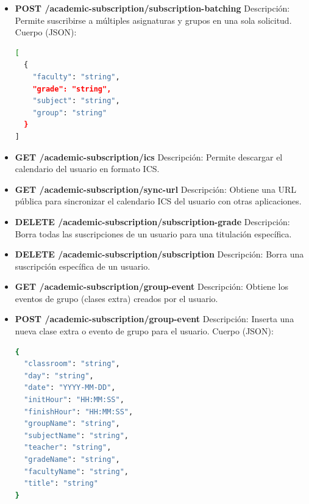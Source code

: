 \begin{itemize}
\begin{itemize}
        \item \textbf{POST /academic-subscription/subscription-batching}
        \newline Descripción: Permite suscribirse a múltiples asignaturas y grupos en una sola solicitud.
        \newline Cuerpo (JSON):
\begin{lstlisting}[language=bash]
[
  {
    "faculty": "string",
    "grade": "string",
    "subject": "string",
    "group": "string"
  }
]
\end{lstlisting}

        \item \textbf{GET /academic-subscription/ics}
        \newline Descripción: Permite descargar el calendario del usuario en formato ICS.

        \item \textbf{GET /academic-subscription/sync-url}
        \newline Descripción: Obtiene una URL pública para sincronizar el calendario ICS del usuario con otras aplicaciones.

        \item \textbf{DELETE /academic-subscription/subscription-grade}
        \newline Descripción: Borra todas las suscripciones de un usuario para una titulación específica.

        \item \textbf{DELETE /academic-subscription/subscription}
        \newline Descripción: Borra una suscripción específica de un usuario.

        \item \textbf{GET /academic-subscription/group-event}
        \newline Descripción: Obtiene los eventos de grupo (clases extra) creados por el usuario.

        \item \textbf{POST /academic-subscription/group-event}
        \newline Descripción: Inserta una nueva clase extra o evento de grupo para el usuario.
        \newline Cuerpo (JSON):
\begin{lstlisting}[language=bash]
{
  "classroom": "string",
  "day": "string",
  "date": "YYYY-MM-DD",
  "initHour": "HH:MM:SS",
  "finishHour": "HH:MM:SS",
  "groupName": "string",
  "subjectName": "string",
  "teacher": "string",
  "gradeName": "string",
  "facultyName": "string",
  "title": "string"
}
\end{lstlisting}


\end{itemize}
\end{itemize}
